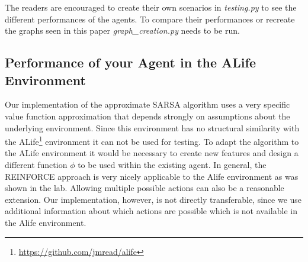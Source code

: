 \documentclass[journal, a4paper]{IEEEtran}
\theoremstyle{plain}
\theoremstyle{definition}
\begin{document}
The readers are encouraged to create their own scenarios in \textit{testing.py} to see the different performances of the agents. To compare their performances or recreate the graphs seen in this paper \textit{graph\_creation.py} needs to be run.

 


\subsection{Performance of your Agent in the ALife Environment}
Our implementation of the approximate SARSA algorithm uses a very specific value function approximation that depends strongly on assumptions about the underlying environment. Since this environment has no structural similarity with the ALife\footnote{\url{https://github.com/jmread/alife}} environment it can not be used for testing. To adapt the algorithm to the ALife environment it would be necessary to create new features and design a different function $\phi$ to be used within the existing agent.
\newline
In general, the REINFORCE approach is very nicely applicable to the Alife environment as was shown in the lab. Allowing multiple possible actions can also be a reasonable extension. Our implementation, however, is not directly transferable, since we use additional information about which actions are possible which is not available in the Alife environment.
\end{document}
